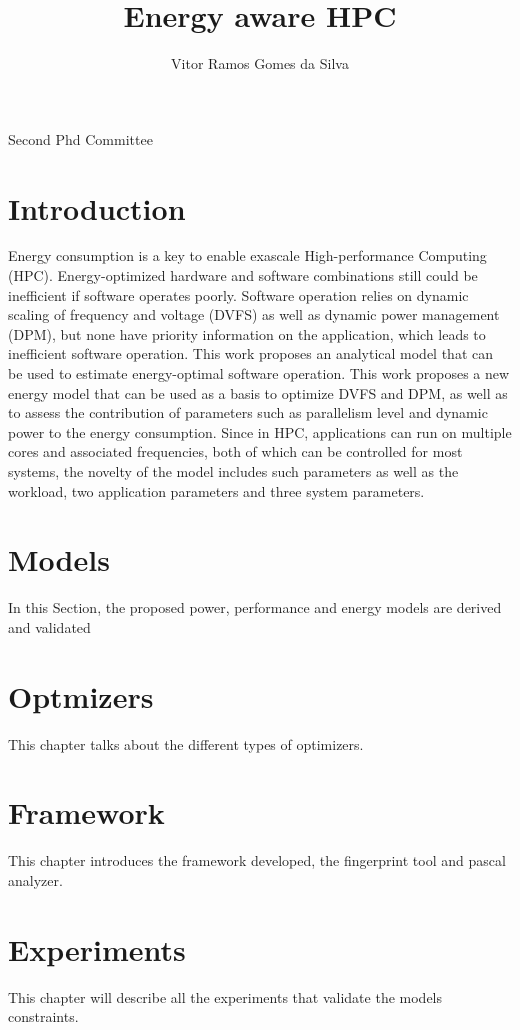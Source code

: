 \documentclass{report}
\begin{document}
\title{Energy aware HPC}
\author{Vitor Ramos Gomes da Silva}
 
\beforepreface
{}
Second Phd Committee
\afterpreface

\chapter{Introduction}
Energy consumption is a key to enable exascale High-performance Computing (HPC). Energy-optimized hardware and software combinations still could be inefficient if software operates poorly. 
Software operation relies on dynamic scaling of frequency and voltage (DVFS) as well as dynamic power management (DPM), but none have priority information on the application, which leads to inefficient software operation. This work proposes an analytical model that can be used to estimate energy-optimal software operation. 
This work proposes a new energy model that can be used as a basis to optimize DVFS and DPM, as well as to assess the contribution of parameters such as parallelism level and dynamic power to the energy consumption.
Since in HPC, applications can run on multiple cores and associated frequencies, both of which can be controlled for most systems, the novelty of the model includes such parameters as well as the workload, two application parameters and three system parameters.


%


\chapter{Models}
In this Section, the proposed power, performance and energy models are derived and validated



\chapter{Optmizers}
This chapter talks about the different types of optimizers.


\chapter{Framework}
This chapter introduces the framework developed, the fingerprint tool and pascal analyzer.



\chapter{Experiments}
This chapter will describe all the experiments that validate the models constraints.






\end{document}
